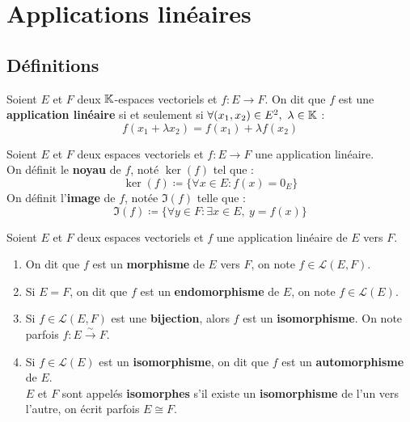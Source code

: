 \chapter{Applications linéaires}

\section{Définitions}
\begin{definition}
    Soient $E$ et $F$ deux $\mathbb{K}$-espaces vectoriels et $f : E \to F$.
    On dit que $f$ est une \textbf{application linéaire} si et seulement si $\forall (x_1, x_2) \in E^2,\ \lambda \in \mathbb{K}$ :
    \[ f(x_1 + \lambda x_2) = f(x_1) + \lambda f(x_2) \]
\end{definition}

\begin{definition}
    Soient $E$ et $F$ deux espaces vectoriels et $f : E \to F$ une application linéaire.
    \\
    On définit le \textbf{noyau} de $f$, noté $\ker(f)$ tel que :
    \[ \ker(f) \coloneqq \{ \forall x \in E : f(x) = 0_E \} \] 
    On définit l'\textbf{image} de $f$, notée $\Im(f)$ telle que :
    \[ \Im(f) \coloneqq \{ \forall y \in F : \exists x \in E,\ y = f(x) \} \]
\end{definition}

\begin{definition}
    \par \noindent Soient $E$ et $F$ deux espaces vectoriels et $f$ une application linéaire de $E$ vers $F$.
    \begin{enumerate}
        \item On dit que $f$ est un \textbf{morphisme} de $E$ vers $F$, on note $f \in \mathcal{L}(E, F)$.
        \item Si $E = F$, on dit que $f$ est un \textbf{endomorphisme} de $E$, on note $f \in \mathcal{L}(E)$.
        \item Si $f \in \mathcal{L}(E, F)$ est une \textbf{bijection}, alors $f$ est un \textbf{isomorphisme}. On note parfois $f : E \overset{\sim}{\to} F$.
        \item Si $f \in \mathcal{L}(E)$ est un \textbf{isomorphisme}, on dit que $f$ est un \textbf{automorphisme} de $E$.
        \\
        $E$ et $F$ sont appelés \textbf{isomorphes} s'il existe un \textbf{isomorphisme} de l'un vers l'autre, on écrit parfois $E \cong F$.
    \end{enumerate}
\end{definition}

